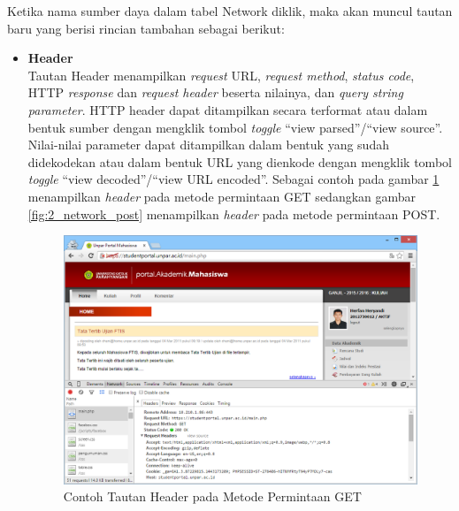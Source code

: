 Ketika nama sumber daya dalam tabel Network diklik, maka akan muncul tautan baru yang berisi rincian tambahan sebagai berikut:
\begin{itemize}
	\item \textbf{Header}\\
	Tautan Header menampilkan \textit{request} URL, \textit{request method}, \textit{status code}, HTTP \textit{response} dan \textit{request header} beserta nilainya, dan \textit{query string parameter}. HTTP header dapat ditampilkan secara terformat atau dalam bentuk sumber dengan mengklik tombol \textit{toggle} ``view parsed''/``view source''. Nilai-nilai parameter dapat ditampilkan dalam bentuk yang sudah didekodekan atau dalam bentuk URL yang dienkode dengan mengklik tombol \textit{toggle} ``view decoded''/``view URL encoded''. Sebagai contoh pada gambar \ref{fig:2_network_get} menampilkan \textit{header} pada metode permintaan GET sedangkan gambar \ref{fig:2_network_post} menampilkan \textit{header} pada metode permintaan POST.
	
\begin{figure}[H]
	\centering
	\includegraphics[scale=0.5]{Gambar/network-header}
	\caption{Contoh Tautan Header pada Metode Permintaan GET} 
	\label{fig:2_network_get}
\end{figure}


\end{itemize}
